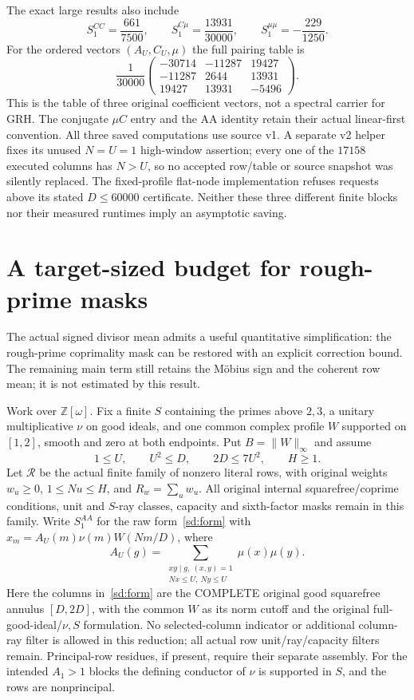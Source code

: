 \documentclass[11pt]{article}
\theoremstyle{definition}\newtheorem{definition}[theorem]{Definition}
\theoremstyle{remark}\newtheorem{remark}[theorem]{Remark}
\begin{document}
The exact large results also include
\[
 S_1^{CC}=\frac{661}{7500},\qquad
 S_1^{C\mu}=\frac{13931}{30000},\qquad
 S_1^{\mu\mu}=-\frac{229}{1250}.
\]
For the ordered vectors $(A_U,C_U,\mu)$ the full pairing table is
\[
 \frac1{30000}
 \begin{pmatrix}
 -30714&-11287&19427\\
 -11287&2644&13931\\
 19427&13931&-5496
 \end{pmatrix}.
\]
This is the table of three original coefficient vectors, not a spectral
carrier for GRH. The conjugate $\mu C$ entry and the AA identity retain
their actual linear-first convention. All three saved computations use source v1.
A separate v2 helper fixes its unused $N=U=1$ high-window assertion;
every one of the $17158$ executed columns has $N>U$, so no accepted
row/table or source snapshot was silently replaced.
The fixed-profile flat-node implementation refuses requests above its
stated $D\le60000$ certificate. Neither these three different finite
blocks nor their measured runtimes imply an asymptotic saving.

\section{A target-sized budget for rough-prime masks}\label{rma:core}
The actual signed divisor mean admits a useful quantitative simplification:
the rough-prime coprimality mask can be restored with an explicit correction
bound.
The remaining main term still retains the M\"obius sign and the coherent
row mean; it is not estimated by this result.

Work over $\mathbb Z[\omega]$. Fix a finite $S$ containing the primes above $2,3$,
a unitary multiplicative $\nu$ on good ideals, and one common complex
profile $W$ supported on $[1,2]$, smooth and zero at both endpoints.
Put $B=\|W\|_\infty$ and assume
\begin{equation}\label{rma:window}
 1\le U,\qquad U^2\le D,\qquad 2D\le7U^2,\qquad H\ge1.
\end{equation}
Let $\mathcal R$ be the actual finite family of nonzero literal rows,
with original weights $w_u\ge0$, $1\le Nu\le H$, and $R_w=\sum_u w_u$. All original internal
squarefree/coprime conditions, unit and $S$-ray classes, capacity and
sixth-factor masks remain in this family. Write $S_1^{AA}$ for the raw
form~\eqref{sd:form} with $x_m=A_U(m)\nu(m)W(Nm/D)$, where
\begin{equation}\label{rma:AU}
 A_U(g)=\sum_{\substack{xy\mid g,\ (x,y)=1\\Nx\le U,\ Ny\le U}}
                  \mu(x)\mu(y).
\end{equation}
Here the columns in~\eqref{sd:form} are the COMPLETE original good
squarefree annulus $[D,2D]$, with the common $W$ as its norm cutoff and
the original full-good-ideal/$\nu,S$ formulation. No selected-column
indicator or additional column-ray filter is allowed in this reduction;
all actual row unit/ray/capacity filters remain.
Principal-row residues, if present, require their separate assembly.
For the intended $A_1>1$ blocks the defining conductor of $\nu$ is
supported in $S$, and the rows are nonprincipal.
\end{document}
